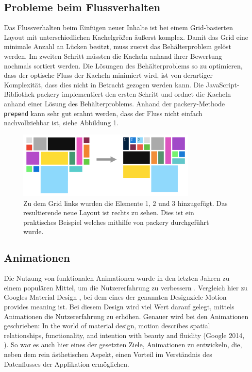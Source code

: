 \documentclass[12pt,twoside]{book}
\begin{document}
  \subsection{Probleme beim Flussverhalten}
  Das Flussverhalten beim Einfügen neuer Inhalte ist bei einem Grid-basierten Layout mit unterschiedlichen Kachelgrößen äußerst komplex. Damit das Grid eine minimale Anzahl an Lücken besitzt, muss zuerst das Behälterproblem gelöst werden. Im zweiten Schritt müssten die Kacheln anhand ihrer Bewertung nochmals sortiert werden. Die Lösungen des Behälterproblems so zu optimieren, dass der optische Fluss der Kacheln minimiert wird, ist von derartiger Komplexität, dass dies nicht in Betracht gezogen werden kann. Die JavaScript-Bibliothek packery \cite{packery} implementiert den ersten Schritt und ordnet die Kacheln anhand einer Lösung des Behälterproblems. Anhand der packery-Methode \texttt{prepend} kann sehr gut erahnt werden, dass der Fluss nicht einfach nachvollziehbar ist, siehe Abbildung \ref{fig:grid_flow}.

  \begin{figure}[htbp]
    \centering
    \includegraphics[width=0.8\textwidth]{images/grid_flow.png}
    \caption{Zu dem Grid links wurden die Elemente 1, 2 und 3 hinzugefügt. Das resultierende neue Layout ist rechts zu sehen. Dies ist ein praktisches Beispiel welches mithilfe von packery durchgeführt wurde.}
    \label{fig:grid_flow}
  \end{figure}


\subsection{Animationen}

Die Nutzung von funktionalen Animationen wurde in den letzten Jahren zu einem populären Mittel, um die Nutzererfahrung zu verbessern \cite{functionalanimations}. Vergleich hier zu Googles Material Design \cite{materialdesign}, bei dem eines der genannten Designziele \glqq Motion provides meaning\grqq{} ist. Bei diesem Design wird viel Wert darauf gelegt, mittels Animationen die Nutzererfahrung zu erhöhen. Genauer wird bei den Animationen geschrieben: \glqq In the world of material design, motion describes spatial relationships, functionality, and intention with beauty and fluidity\grqq{} (Google 2014, \cite{materialdesign}).
So war es auch hier eines der gesetzten Ziele, Animationen zu entwickeln, die, neben dem rein ästhetischen Aspekt, einen Vorteil im Verständnis des Datenflusses der Applikation ermöglichen.
\end{document}
